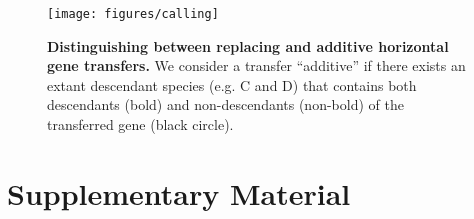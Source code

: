 \documentclass[12pt]{article}
\begin{document}
\begin{figure}
\begin{center}
\texttt{[image: figures/calling]}
\end{center}
\caption{
{\bf Distinguishing between replacing and additive horizontal gene transfers.}
We consider a transfer ``additive'' if there exists an extant descendant species
(e.g. C and D) that contains both descendants (bold) and
non-descendants (non-bold) of the transferred gene (black circle).}
\label{fig:calling-transfers}
\end{figure}
\clearpage{}%

\clearpage{}
\section*{Supplementary Material}

% 
% 
% 
 
\end{document}

